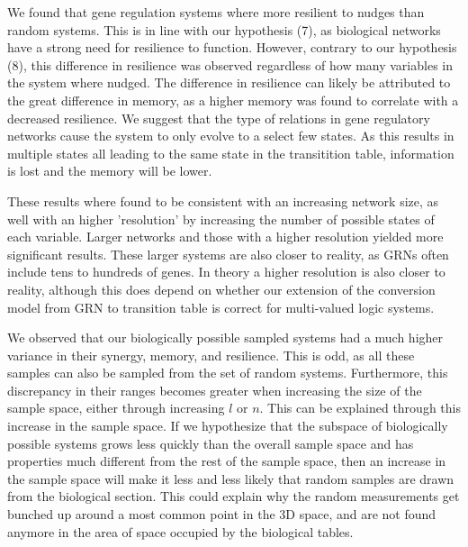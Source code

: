 \documentclass[../main.tex]{subfiles}
\begin{document}
We found that gene regulation systems where more resilient to nudges than random systems.
This is in line with our hypothesis (7), as biological networks have a strong need for resilience to function.
However, contrary to our hypothesis (8), this difference in resilience was observed regardless of how many variables in the system where nudged.
The difference in resilience can likely be attributed to the great difference in memory, as a higher memory was found to correlate with a decreased resilience.
We suggest that the type of relations in gene regulatory networks cause the system to only evolve to a select few states.
As this results in multiple states all leading to the same state in the transitition table, information is lost and the memory will be lower.

These results where found to be consistent with an increasing network size, as well with an higher 'resolution' by increasing the number of possible states of each variable.
Larger networks and those with a higher resolution yielded more significant results.
These larger systems are also closer to reality, as GRNs often include tens to hundreds of genes.
In theory a higher resolution is also closer to reality, although this does depend on whether our extension of the conversion model from GRN to transition table is correct for multi-valued logic systems.

We observed that our biologically possible sampled systems had a much higher variance in their synergy, memory, and resilience.
This is odd, as all these samples can also be sampled from the set of random systems.
Furthermore, this discrepancy in their ranges becomes greater when increasing the size of the sample space, either through increasing $l$ or $n$.
This can be explained through this increase in the sample space.
If we hypothesize that the subspace of biologically possible systems grows less quickly than the overall sample space and has properties much different from the rest of the sample space, then an increase in the sample space will make it less and less likely that random samples are drawn from the biological section.
This could explain why the random measurements get bunched up around a most common point in the 3D space, and are not found anymore in the area of space occupied by the biological tables.
\end{document}
